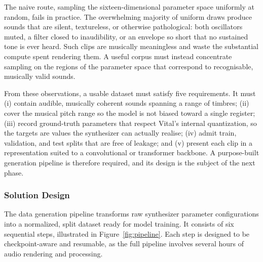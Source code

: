 \noindent \newline
The naive route, sampling the sixteen-dimensional parameter space uniformly at random, fails in practice. The overwhelming majority of uniform draws produce sounds that are silent, textureless, or otherwise pathological: both oscillators muted, a filter closed to inaudibility, or an envelope so short that no sustained tone is ever heard. Such clips are musically meaningless and waste the substantial compute spent rendering them. A useful corpus must instead concentrate sampling on the regions of the parameter space that correspond to recognisable, musically valid sounds.

\noindent \newline
From these observations, a usable dataset must satisfy five requirements. It must (i) contain audible, musically coherent sounds spanning a range of timbres; (ii) cover the musical pitch range so the model is not biased toward a single register; (iii) record ground-truth parameters that respect Vital's internal quantization, so the targets are values the synthesizer can actually realise; (iv) admit train, validation, and test splits that are free of leakage; and (v) present each clip in a representation suited to a convolutional or transformer backbone. A purpose-built generation pipeline is therefore required, and its design is the subject of the next phase.

\subsubsection{Solution Design}

The data generation pipeline transforms raw synthesizer parameter configurations into a normalized, split dataset ready for model training. It consists of six sequential steps, illustrated in Figure~\ref{fig:pipeline}. Each step is designed to be checkpoint-aware and resumable, as the full pipeline involves several hours of audio rendering and processing.

